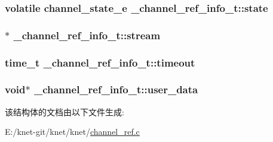 \subsubsection[{state}]{\setlength{\rightskip}{0pt plus 5cm}volatile {\bf channel\+\_\+state\+\_\+e} \+\_\+channel\+\_\+ref\+\_\+info\+\_\+t\+::state}\label{a00004_ae42dcee90ddf852cdbd17ed254973f04_ae42dcee90ddf852cdbd17ed254973f04}
\hypertarget{a00004_a27701935d3cd7358a0b92b3495afce7f_a27701935d3cd7358a0b92b3495afce7f}{}
\subsubsection[{stream}]{$\ast$ \+\_\+channel\+\_\+ref\+\_\+info\+\_\+t\+::stream}\label{a00004_a27701935d3cd7358a0b92b3495afce7f_a27701935d3cd7358a0b92b3495afce7f}
\hypertarget{a00004_a8bc54a1cbfc3bab17586ca3bfae321b4_a8bc54a1cbfc3bab17586ca3bfae321b4}{}
\subsubsection[{timeout}]{\setlength{\rightskip}{0pt plus 5cm}time\+\_\+t \+\_\+channel\+\_\+ref\+\_\+info\+\_\+t\+::timeout}\label{a00004_a8bc54a1cbfc3bab17586ca3bfae321b4_a8bc54a1cbfc3bab17586ca3bfae321b4}
\hypertarget{a00004_a1dff9bf18d0c5b4591b31bc5929422a5_a1dff9bf18d0c5b4591b31bc5929422a5}{}
\subsubsection[{user\+\_\+data}]{\setlength{\rightskip}{0pt plus 5cm}void$\ast$ \+\_\+channel\+\_\+ref\+\_\+info\+\_\+t\+::user\+\_\+data}\label{a00004_a1dff9bf18d0c5b4591b31bc5929422a5_a1dff9bf18d0c5b4591b31bc5929422a5}


该结构体的文档由以下文件生成\+:\begin{DoxyCompactItemize}
\item 
E\+:/knet-\/git/knet/knet/\hyperlink{a00047}{channel\+\_\+ref.\+c}\end{DoxyCompactItemize}

